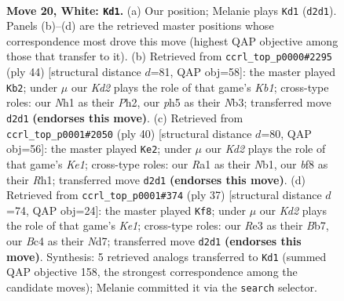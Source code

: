 \documentclass[11pt]{article}
\begin{document}
\clearpage

\begin{figure}[p]\centering
\begin{subfigure}{0.46\textwidth}\centering
\resizebox{\linewidth}{!}{%
\newchessgame
\chessboard[
  setfen={r3kbnr/2n3p1/6b1/7p/p1B1pP1P/P3R3/1P1K2P1/R5NN w kq - 0 20},
  showmover=false,
  pgfstyle=straightmove, color=movearrow, markmove={d2-d1}
]}
\caption{}
\end{subfigure}\hfill
\begin{subfigure}{0.46\textwidth}\centering
\resizebox{\linewidth}{!}{%
\newchessgame
\chessboard[
  setfen={4b2r/1pr1kpR1/p3p2p/1n2P3/5P2/1N6/P1P1B1PP/1K5R w - - 1 23},
  showmover=false,
  pgfstyle=straightmove, color=movearrow, markmove={b1-b2}
]}
\caption{}
\end{subfigure}
\\[4pt]
\begin{subfigure}{0.46\textwidth}\centering
\resizebox{\linewidth}{!}{%
\newchessgame
\chessboard[
  setfen={2r1k2r/pb3p2/n1pRp3/P5Pp/1pB1P3/6B1/1b3PP1/1N2K2R w Kk - 1 21},
  showmover=false,
  pgfstyle=straightmove, color=movearrow, markmove={e1-e2}
]}
\caption{}
\end{subfigure}\hfill
\begin{subfigure}{0.46\textwidth}\centering
\resizebox{\linewidth}{!}{%
\newchessgame
\chessboard[
  setfen={r3k3/pb1n1pr1/4p2p/1NP5/1pp1P2P/5B2/PP3PP1/R3K2R b KQq - 1 19},
  showmover=false,
  pgfstyle=straightmove, color=movearrow, markmove={e8-f8}
]}
\caption{}
\end{subfigure}
\caption{\textbf{Move 20, White: \texttt{Kd1}.} (a) Our position; Melanie plays \texttt{Kd1} (\texttt{d2d1}). Panels (b)--(d) are the retrieved master positions whose correspondence most drove this move (highest QAP objective among those that transfer to it). (b) Retrieved from \texttt{ccrl\_top\_p0000\#2295} (ply 44) [structural distance $d$=81, QAP obj=58]: the master played \texttt{Kb2}; under $\mu$ our \emph{Kd2} plays the role of that game's \emph{Kb1}; cross-type roles: our \emph{N}h1 as their \emph{P}h2, our \emph{p}h5 as their \emph{N}b3; transferred move \texttt{d2d1} \textbf{(endorses this move)}. (c) Retrieved from \texttt{ccrl\_top\_p0001\#2050} (ply 40) [structural distance $d$=80, QAP obj=56]: the master played \texttt{Ke2}; under $\mu$ our \emph{Kd2} plays the role of that game's \emph{Ke1}; cross-type roles: our \emph{R}a1 as their \emph{N}b1, our \emph{b}f8 as their \emph{R}h1; transferred move \texttt{d2d1} \textbf{(endorses this move)}. (d) Retrieved from \texttt{ccrl\_top\_p0001\#374} (ply 37) [structural distance $d$=74, QAP obj=24]: the master played \texttt{Kf8}; under $\mu$ our \emph{Kd2} plays the role of that game's \emph{Ke1}; cross-type roles: our \emph{R}e3 as their \emph{B}b7, our \emph{B}c4 as their \emph{N}d7; transferred move \texttt{d2d1} \textbf{(endorses this move)}. Synthesis: 5 retrieved analogs transferred to \texttt{Kd1} (summed QAP objective 158, the strongest correspondence among the candidate moves); Melanie committed it via the \texttt{search} selector.}
\label{fig:thought-m38}
\end{figure}
\end{document}

